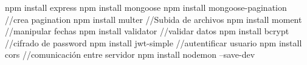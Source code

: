 npm install express
npm install mongoose
npm install mongoose-pagination     //crea pagination 
npm install multer                  //Subida de archivos 
npm install moment                  //manipular fechas 
npm install validator               //validar datos 
npm install bcrypt                  //cifrado de password
npm install jwt-simple              //autentificar usuario 
npm install cors                    //comunicación entre servidor 
npm install nodemon --save-dev
